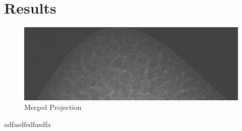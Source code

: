 \section{Results}
\begin{figure}[htbp]
	\centering
		\includegraphics[width=1.00\textwidth]{img/R108C36c_merge0801.png}
	\caption{Merged Projection}
	\label{fig:R108C36c_merge0801}
\end{figure}
adfasdfsdfasdfa